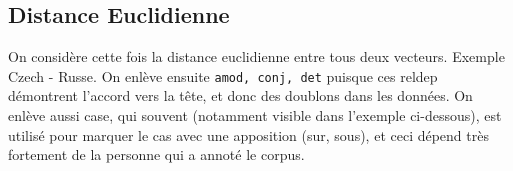 \documentclass{cours}
\begin{document}
    \subsection{Distance Euclidienne}
    On considère cette fois la distance euclidienne entre tous deux vecteurs.
    Exemple Czech - Russe.
    On enlève ensuite \texttt{amod, conj, det} puisque ces reldep démontrent l'accord vers la tête, et donc des doublons dans les données. On enlève aussi case, qui souvent (notamment visible dans l'exemple ci-dessous), est utilisé pour marquer le cas avec une apposition (sur, sous), et ceci dépend très fortement de la personne qui a annoté le corpus.
\end{document}
